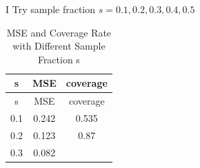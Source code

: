 \documentclass[]{article}
\begin{document}
I Try sample fraction \(s = 0.1, 0.2, 0.3, 0.4, 0.5\)

\begin{longtable}[]{@{}ccc@{}}
\caption{MSE and Coverage Rate with Different Sample Fraction
s}\tabularnewline
\toprule
\begin{minipage}[b]{0.08\columnwidth}\centering\strut
s\strut
\end{minipage} & \begin{minipage}[b]{0.10\columnwidth}\centering\strut
MSE\strut
\end{minipage} & \begin{minipage}[b]{0.13\columnwidth}\centering\strut
coverage\strut
\end{minipage}\tabularnewline
\midrule
\endfirsthead
\toprule
\begin{minipage}[b]{0.08\columnwidth}\centering\strut
s\strut
\end{minipage} & \begin{minipage}[b]{0.10\columnwidth}\centering\strut
MSE\strut
\end{minipage} & \begin{minipage}[b]{0.13\columnwidth}\centering\strut
coverage\strut
\end{minipage}\tabularnewline
\midrule
\endhead
\begin{minipage}[t]{0.08\columnwidth}\centering\strut
0.1\strut
\end{minipage} & \begin{minipage}[t]{0.10\columnwidth}\centering\strut
0.242\strut
\end{minipage} & \begin{minipage}[t]{0.13\columnwidth}\centering\strut
0.535\strut
\end{minipage}\tabularnewline
\begin{minipage}[t]{0.08\columnwidth}\centering\strut
0.2\strut
\end{minipage} & \begin{minipage}[t]{0.10\columnwidth}\centering\strut
0.123\strut
\end{minipage} & \begin{minipage}[t]{0.13\columnwidth}\centering\strut
0.87\strut
\end{minipage}\tabularnewline
\begin{minipage}[t]{0.08\columnwidth}\centering\strut
0.3\strut
\end{minipage} & \begin{minipage}[t]{0.10\columnwidth}\centering\strut
0.082\strut
\end{minipage} & \begin{minipage}[t]{0.13\columnwidth}\centering\strut

\end{minipage}
\end{longtable}
\end{document}
